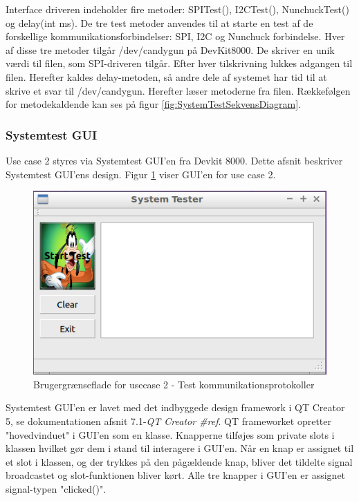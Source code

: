 \noindent Interface driveren indeholder fire metoder: SPITest(), I2CTest(), NunchuckTest() og delay(int ms). De tre test metoder anvendes til at starte en test af de forskellige kommunikationsforbindelser: SPI, I2C og Nunchuck forbindelse. Hver af disse tre metoder tilgår /dev/candygun på DevKit8000. De skriver en unik værdi til filen, som SPI-driveren tilgår. Efter hver tilskrivning lukkes adgangen til filen. Herefter kaldes delay-metoden, så andre dele af systemet har tid til at skrive et svar til /dev/candygun. Herefter læser metoderne fra filen. Rækkefølgen for metodekaldende kan ses på figur \ref{fig:SystemTestSekvensDiagram}.

\subsubsection{Systemtest GUI}
\label{afsnit:sysGUI}
Use case 2 styres via Systemtest GUI'en fra Devkit 8000. Dette afsnit beskriver Systemtest GUI'ens design. Figur \ref{fig:GUIPic} viser GUI'en for use case 2.

\begin{figure}[H]
	\centering
	\includegraphics[width=\textwidth]{Afsnit/DesignOgImplementering/images/GUIPic}
	\caption{Brugergrænseflade for usecase 2 - Test kommunikationsprotokoller}
	\label{fig:GUIPic}
\end{figure}

\noindent Systemtest GUI'en er lavet med det indbyggede design framework i QT Creator 5\cite{Website:QTCreator}, se dokumentationen afsnit 7.1-\textit{QT Creator \#ref}.
QT frameworket opretter "hovedvinduet" i GUI'en som en klasse. Knapperne tilføjes som private slots i klassen hvilket gør dem i stand til interagere i GUI'en. Når en knap er assignet til et slot i klassen, og der trykkes på den pågældende knap, bliver det tildelte signal broadcastet og slot-funktionen bliver kørt. Alle tre knapper i GUI'en er assignet signal-typen "clicked()". \newline 


